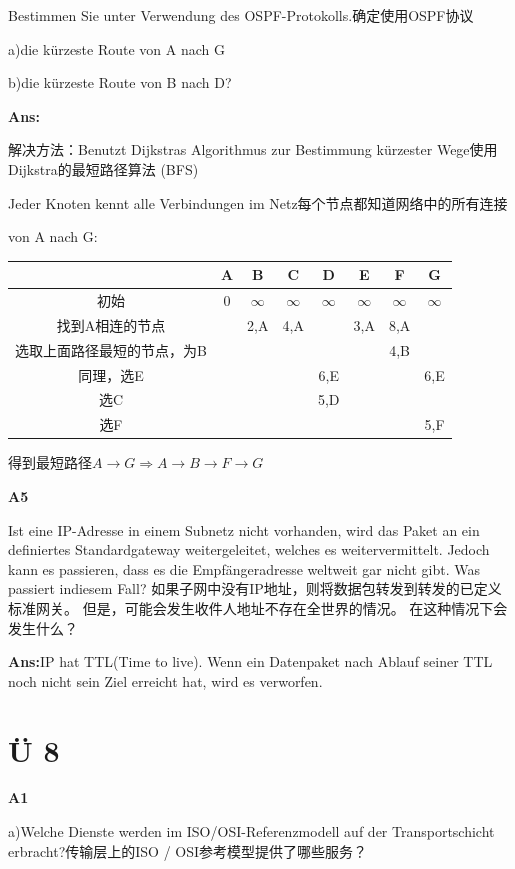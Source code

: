 \documentclass[fleqn]{article}
\begin{document}
Bestimmen Sie unter Verwendung des OSPF-Protokolls.确定使用OSPF协议

a)die kürzeste Route von A nach G

b)die kürzeste Route von B nach D?

\textbf{Ans:}

解决方法：Benutzt Dijkstras Algorithmus zur Bestimmung kürzester Wege使用Dijkstra的最短路径算法
(BFS)

Jeder Knoten kennt alle Verbindungen im Netz每个节点都知道网络中的所有连接

von A nach G:

\begin{center}
    \begin{tabular}{c|c|c|c|c|c|c|c}
        &A&B&C&D&E&F&G\\
        \hline
        初始&0&$\infty$&$\infty$&$\infty$&$\infty$&$\infty$&$\infty$\\
        \hline
        找到A相连的节点&&2,A&4,A&&3,A&8,A\\
        \hline
        选取上面路径最短的节点，为B&&&&&&4,B\\
        \hline
        同理，选E&&&&6,E&&&6,E\\
        \hline
        选C&&&&5,D&&&\\
        \hline
        选F&&&&&&&5,F
    \end{tabular}
\end{center}

得到最短路径$A\rightarrow G \Rightarrow A\rightarrow B\rightarrow F\rightarrow G$

\noindent\textbf{A5}

Ist eine IP-Adresse in einem Subnetz nicht vorhanden, wird das Paket an ein definiertes Standardgateway weitergeleitet, welches es weitervermittelt. Jedoch kann es passieren, dass es die Empfängeradresse weltweit gar nicht gibt. Was passiert indiesem Fall?
如果子网中没有IP地址，则将数据包转发到转发的已定义标准网关。 但是，可能会发生收件人地址不存在全世界的情况。 在这种情况下会发生什么？

\textbf{Ans:}IP hat TTL(Time to live). Wenn ein Datenpaket nach Ablauf seiner TTL noch nicht sein Ziel erreicht hat, wird es verworfen.

\section{Ü 8}

\noindent\textbf{A1}

a)Welche Dienste werden im ISO/OSI-Referenzmodell auf der Transportschicht erbracht?传输层上的ISO / OSI参考模型提供了哪些服务？
\end{document}
